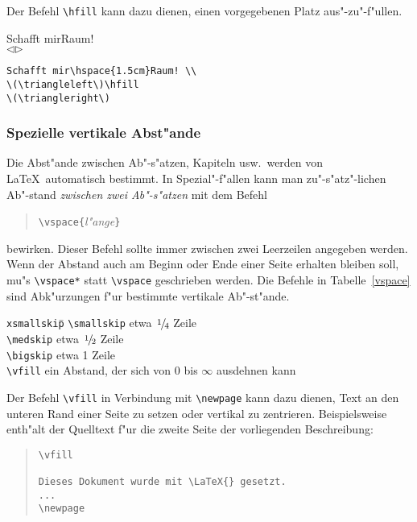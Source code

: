 Der Befehl \verb|\hfill| kann dazu dienen, einen vorgegebenen
Platz aus"-zu"-f"ullen.
\exa
\raggedright
Schafft mir\hspace{1.5cm}Raum! \\
\(\triangleleft\)\hfill \(\triangleright\)\\
\exb
\begin{verbatim}
Schafft mir\hspace{1.5cm}Raum! \\
\(\triangleleft\)\hfill 
\(\triangleright\)
\end{verbatim}
\exc


\subsubsection{Spezielle vertikale Abst"ande} \label{vabstaende}
 
Die Abst"ande zwischen Ab"-s"atzen, Kapiteln usw.\ werden von
\LaTeX\ automatisch bestimmt.
In Spezial"-f"allen kann man zu"-s"atz"-lichen Ab"-stand
\emph{zwischen zwei Ab"-s"atzen} mit dem Befehl
\begin{verse}
\verb|\vspace{|\textit{l"ange}\verb|}|
\end{verse}
bewirken.
Dieser Befehl sollte immer zwischen zwei Leerzeilen angegeben
werden.
Wenn der Abstand auch am Beginn oder Ende einer Seite erhalten
bleiben soll, mu"s \verb|\vspace*| statt \verb|\vspace|
geschrieben werden.
Die Befehle in Tabelle~\ref{vspace} sind Abk"urzungen f"ur
bestimmte vertikale Ab"-st"ande.
\begin{table}[t]
\caption{Befehle f"ur vertikale Abst"ande} \label{vspace}
\oben{13cm}
\begin{tabbing}
\texttt{xsmallskip}\qquad \= \kill
\verb|\smallskip| \> etwa \(\nfrac{1}{4}\) Zeile \\
\verb|\medskip|   \> etwa \(\nfrac{1}{2}\) Zeile \\
\verb|\bigskip|   \> etwa 1 Zeile \\
\verb|\vfill|     \> ein Abstand, der sich von 0 bis \(\infty\)
                     ausdehnen kann
\end{tabbing}
\unten
\end{table}
Der Befehl \verb|\vfill| in Verbindung mit \verb|\newpage|
kann dazu dienen, Text an den unteren Rand einer Seite zu setzen
oder vertikal zu zentrieren.  Beispielsweise enth"alt der Quelltext
f"ur die zweite Seite der vorliegenden Beschreibung:
\begin{quote}
\begin{verbatim}
\vfill

Dieses Dokument wurde mit \LaTeX{} gesetzt.
...
\newpage
\end{verbatim}
\end{quote}
 
